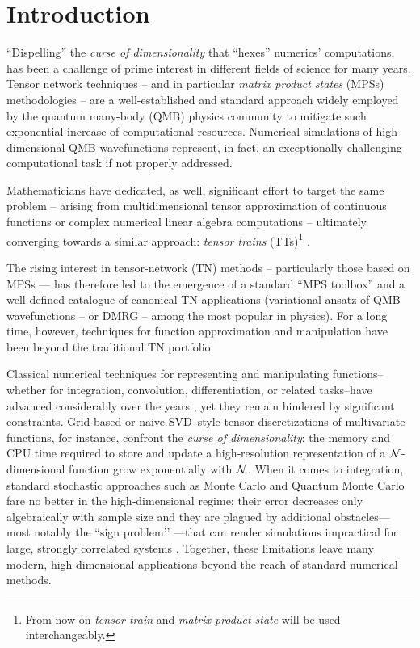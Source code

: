 \chapter{Introduction}
\label{chap:intro}
``Dispelling'' the \textit{curse of dimensionality} that ``hexes'' numerics' computations, has been a challenge of prime interest in different fields of science for many years. 
Tensor network techniques -- and in particular \textit{matrix product states} (MPSs) methodologies -- are a well-established \cite{Fannes1992,White1992,Schollwock2011,Vidal2003,VerstraeteCirac2004,vonDelftTNNotes,tensornetwork.org} and standard approach widely employed by the quantum many-body (QMB) physics community to mitigate such exponential increase of computational resources. Numerical simulations of high-dimensional QMB wavefunctions represent, in fact, an exceptionally challenging computational task if not properly addressed.

Mathematicians have dedicated, as well, significant effort to target the same problem -- arising from multidimensional tensor approximation of continuous functions or complex numerical linear algebra computations \cite{Oseledets2009Intro, Kolda2009} -- ultimately converging towards a similar approach: \textit{tensor trains} (TTs)\footnote{From now on \textit{tensor train} and \textit{matrix product state} will be used interchangeably.} \cite{Oseledets2011}. 

The rising interest in tensor-network (TN) methods -- particularly those based on MPSs — has therefore led to the emergence of a standard ``MPS toolbox'' \cite{ttpylib, ITensors.jl, QSpace} and a well-defined catalogue of canonical TN applications \cite{Verstraete2008} (variational ansatz of QMB wavefunctions -- or DMRG -- among the most popular in physics). For a long time, however, techniques for function approximation and manipulation have been beyond the traditional TN portfolio.


Classical numerical techniques for representing and manipulating functions--whether for integration, convolution, differentiation, or related tasks--have advanced considerably over the years \cite{Isaacson1994}, yet they remain hindered by significant constraints. Grid‐based or naive SVD–style tensor discretizations of multivariate functions, for instance, confront the \emph{curse of dimensionality}: the memory and CPU time required to store and update a high‐resolution representation of a $\mathcal{N}$-dimensional function grow exponentially with 
$\mathcal{N}$. When it comes to integration, standard stochastic approaches such as Monte Carlo and Quantum Monte Carlo fare no better in the high‐dimensional regime; their error decreases only algebraically with sample size and they are plagued by additional obstacles—most notably the “sign problem’’ \cite{Loh1990}—that can render simulations impractical for large, strongly correlated systems \cite{Fernandez2022}. Together, these limitations leave many modern, high-dimensional applications beyond the reach of standard numerical methods.

